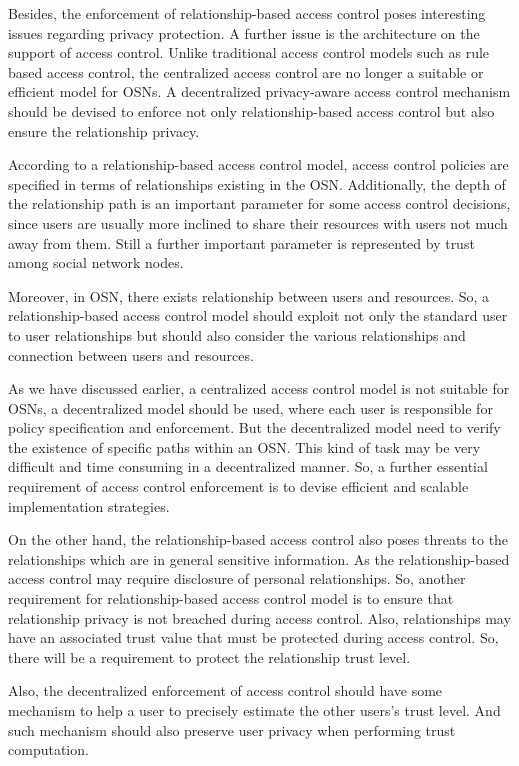 \documentclass[12pt]{article}
\begin{document}
Besides, the enforcement of relationship-based access control poses
interesting issues regarding privacy protection. A further issue is
the architecture on the support of access control. Unlike traditional
access control models such as rule based access control, the
centralized access control are no longer a suitable or efficient model
for OSNs. A decentralized privacy-aware access control mechanism
should be devised to enforce not only relationship-based access
control but also ensure the relationship privacy. 

According to a relationship-based access control model, access control
policies are specified in terms of relationships existing in the
OSN. Additionally, the depth of the relationship path is an important
parameter for some access control decisions, since users are usually
more inclined to share their resources with users not much away from
them. Still a further important parameter is represented by trust
among social network nodes. 

Moreover, in OSN, there exists relationship between users and
resources. So, a relationship-based access control model should
exploit not only the standard user to user relationships but should
also consider the various relationships and connection between users
and resources. 

As we have discussed earlier, a centralized access control model is
not suitable for OSNs, a decentralized model should be used, where
each user is responsible for policy specification and enforcement. But
the decentralized model need to verify the existence of specific paths
within an OSN. This kind of task may be very difficult and time
consuming in a decentralized manner. So, a further essential
requirement of access control enforcement is to devise efficient and
scalable implementation strategies.

On the other hand, the relationship-based access control also poses
threats to the relationships which are in general sensitive
information. As the relationship-based access control may require
disclosure of personal relationships. So, another requirement for
relationship-based access control model is to ensure that relationship
privacy is not breached during access control. Also, relationships may
have an associated trust value that must be protected during access
control. So, there will be a requirement to protect the relationship
trust level.

Also, the decentralized enforcement of access control should have some
mechanism to help a user to precisely estimate the other users's trust
level. And such mechanism should also preserve user privacy when
performing trust computation. 
\end{document}
